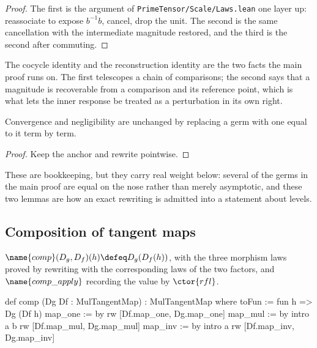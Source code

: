 \begin{proof}
The first is the argument of \texttt{PrimeTensor/Scale/Laws.lean} one layer up:
reassociate to expose $b^{-1}b$, cancel, drop the unit.  The second is the same
cancellation with the intermediate magnitude restored, and the third is the
second after commuting.
\end{proof}

The cocycle identity and the reconstruction identity are the two facts the main
proof runs on.  The first telescopes a chain of comparisons; the second says
that a magnitude is recoverable from a comparison and its reference point,
which is what lets the inner response be treated as a perturbation in its own
right.

\begin{lemma}
\label{Analysis:Chain:lem:congr}
Convergence and negligibility are unchanged by replacing a germ with one equal
to it term by term.
\end{lemma}

\begin{proof}
Keep the anchor and rewrite pointwise.
\end{proof}

These are bookkeeping, but they carry real weight below: several of the germs
in the main proof are equal on the nose rather than merely asymptotic, and
these two lemmas are how an exact rewriting is admitted into a statement about
levels.

\subsection{Composition of tangent maps}

\begin{definition}\label{Analysis:Chain:def:comp}
$\name{comp}(D_g, D_f)(h) \defeq D_g(D_f(h))$, with the three morphism laws
proved by rewriting with the corresponding laws of the two factors, and
$\name{comp\_apply}$ recording the value by $\ctor{rfl}$.
\end{definition}

\begin{leancode}
def comp (Dg Df : MulTangentMap) : MulTangentMap where
  toFun := fun h => Dg (Df h)
  map_one := by
    rw [Df.map_one, Dg.map_one]
  map_mul := by
    intro a b
    rw [Df.map_mul, Dg.map_mul]
  map_inv := by
    intro a
    rw [Df.map_inv, Dg.map_inv]
\end{leancode}

